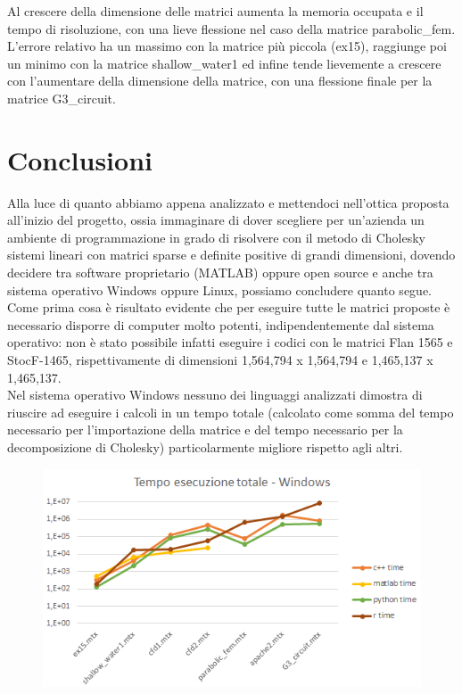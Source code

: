 \documentclass[a4paper,10pt]{article}
\begin{document}
Al crescere della dimensione delle matrici aumenta la memoria occupata e il tempo di risoluzione, con una lieve flessione nel caso della matrice parabolic\_fem.
L’errore relativo ha un massimo con la matrice più piccola (ex15), raggiunge poi un minimo con la matrice shallow\_water1 ed infine tende lievemente a crescere con l’aumentare della dimensione della matrice, con una flessione finale per la matrice G3\_circuit.

\newpage

\section{Conclusioni}

Alla luce di quanto abbiamo appena analizzato e mettendoci nell’ottica proposta all’inizio del progetto, ossia immaginare di dover scegliere per un’azienda un ambiente di programmazione in grado di risolvere con il metodo di Cholesky sistemi lineari con matrici sparse e deﬁnite positive di grandi dimensioni, dovendo decidere tra software proprietario (MATLAB) oppure open source e anche tra sistema operativo Windows oppure Linux, possiamo concludere quanto segue.\\

Come prima cosa è risultato evidente che per eseguire tutte le matrici proposte è necessario disporre di computer molto potenti, indipendentemente dal sistema operativo: non è stato possibile infatti eseguire i codici con le matrici Flan 1565 e StocF-1465, rispettivamente di dimensioni 1,564,794 x 1,564,794 e 1,465,137 x 1,465,137.\\

Nel sistema operativo Windows nessuno dei linguaggi analizzati dimostra di riuscire ad eseguire i calcoli in un tempo totale (calcolato come somma del tempo necessario per l'importazione della matrice e del tempo necessario per la decomposizione di Cholesky) particolarmente migliore rispetto agli altri.

\begin{figure}[H]
\centering
  \includegraphics[width=0.6\linewidth]{img/tempototwin.png}
\end{figure}
\end{document}

